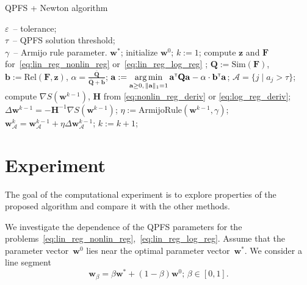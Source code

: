 \documentclass[
11pt,%
tightenlines,%
twoside,%
onecolumn,%
nofloats,%
nobibnotes,%
nofootinbib,%
superscriptaddress,%
noshowpacs,%
centertags]%
{revtex4}
\newcommand{\ba}{\mathbf{a}}
\newcommand{\bb}{\mathbf{b}}
\newcommand{\bw}{\mathbf{w}}
\newcommand{\bz}{\mathbf{z}}
\newcommand{\cA}{\mathcal{A}}
\newcommand{\bQ}{\mathbf{Q}}
\newcommand{\bH}{\mathbf{H}}
\newcommand{\bF}{\mathbf{F}}
\newcommand{\T}{{\text{\tiny\sffamily\upshape\mdseries T}}}
\newcommand{\argmin}{\mathop{\arg \min}\limits}
\begin{document}
\begin{algorithm}
	\caption{QPFS + Newton algorithm}
	\label{pc:QPFSNewton}
	\begin{algorithmic}
		\REQUIRE $\varepsilon$~-- tolerance;\\
		\hspace{1.07cm}$\tau$~-- QPFS solution threshold;\\
		\hspace{1.07cm}$\gamma$~-- Armijo rule parameter.
		\ENSURE $\bw^*$;
		\STATE  initialize $\bw^0$;
		\STATE $k := 1$;
		\REPEAT
		\STATE compute $\bz$ and $\bF$ for~\eqref{eq:lin_reg_nonlin_reg} or~\eqref{eq:lin_reg_log_reg} ;
		\vspace{0.1cm}
		\STATE $\bQ := \text{Sim} (\bF)$, $\bb := \text{Rel}(\bF, \bz)$, $\alpha = \frac{\overline{\bQ}}{\overline{\bQ} + \overline{\bb}}$;
		\vspace{0.1cm}
		\STATE $\ba := \argmin_{\ba \geq 0, \, \|\ba\|_1=1}\ba^{\T} \bQ \ba - \alpha \cdot \mathbf{b}^{\T} \ba$;
		\vspace{0.1cm}
		\STATE $\cA = \{j \mid a_j > \tau\}$;
		\vspace{0.1cm}
		\STATE compute $\nabla S(\bw^{k-1})$, $\bH$ from \eqref{eq:nonlin_reg_deriv} or \eqref{eq:log_reg_deriv};
		\vspace{0.1cm}
		\STATE $\Delta \bw^{k-1} = - \bH^{-1} \nabla S(\bw^{k-1})$;
		\vspace{0.1cm}
		\STATE $\eta := \text{ArmijoRule}(\bw^{k-1}, \gamma)$;
		\vspace{0.1cm}
		\STATE $\bw_{\cA}^k = \bw_{\cA}^{k - 1} + \eta \Delta \bw_{\cA}^{k - 1}$;
		\vspace{0.1cm}
		\STATE $k := k + 1$;
		\vspace{0.1cm}
		\UNTIL{$\frac{\| \bw^k - \bw^{k-1} \|}{\| \bw^k \|} < \varepsilon$}
	\end{algorithmic}
\end{algorithm}

\section{Experiment}
The goal of the computational experiment is to explore properties of the proposed algorithm and compare it with the other methods. 

We investigate the dependence of the QPFS parameters for the problems~\eqref{eq:lin_reg_nonlin_reg},~\eqref{eq:lin_reg_log_reg}. 
Assume that the parameter vector~$\bw^0$ lies near the optimal parameter vector~$\bw^*$. 
We consider a line segment
\[
\bw_{\beta} = \beta \bw^* + (1 - \beta) \bw^0; \, \beta \in [0, 1] .
\]
\end{document}
